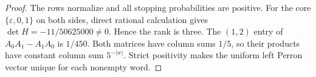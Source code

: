 \begin{proof}
The rows normalize and all stopping probabilities are positive.
For the core $\{\varepsilon,0,1\}$ on both sides, direct rational
calculation gives $\det H=-11/50625000\ne0$. Hence the rank is three.
The $(1,2)$ entry of $A_0A_1-A_1A_0$ is $1/450$.
Both matrices have column sums $1/5$, so their products have constant
column sum $5^{-|w|}$. Strict positivity makes the uniform left
Perron vector unique for each nonempty word.
\end{proof}
